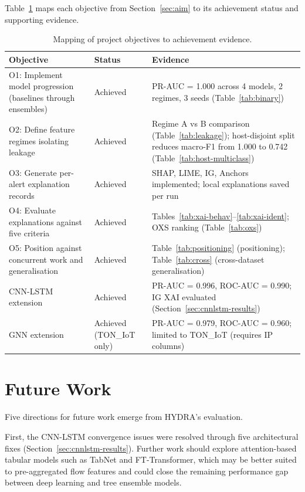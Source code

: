 \documentclass[12pt,a4paper]{report}
\begin{document}
Table~\ref{tab:obj-achievement} maps each objective from Section~\ref{sec:aim} to its achievement status and supporting evidence.

\begin{table}[H]
\centering
\caption{Mapping of project objectives to achievement evidence.}
\label{tab:obj-achievement}
\small
\begin{tabular}{p{}lp{}}
\toprule
\textbf{Objective} & \textbf{Status} & \textbf{Evidence} \\
\midrule
O1: Implement model progression (baselines through ensembles) & Achieved & PR-AUC = 1.000 across 4 models, 2 regimes, 3 seeds (Table~\ref{tab:binary}) \\
\addlinespace
O2: Define feature regimes isolating leakage & Achieved & Regime A vs B comparison (Table~\ref{tab:leakage}); host-disjoint split reduces macro-F1 from 1.000 to 0.742 (Table~\ref{tab:host-multiclass}) \\
\addlinespace
O3: Generate per-alert explanation records & Achieved & SHAP, LIME, IG, Anchors implemented; local explanations saved per run \\
\addlinespace
O4: Evaluate explanations against five criteria & Achieved & Tables~\ref{tab:xai-behav}--\ref{tab:xai-ident}; OXS ranking (Table~\ref{tab:oxs}) \\
\addlinespace
O5: Position against concurrent work and generalisation & Achieved & Table~\ref{tab:positioning} (positioning); Table~\ref{tab:cross} (cross-dataset generalisation) \\
\addlinespace
CNN-LSTM extension & Achieved & PR-AUC = 0.996, ROC-AUC = 0.990; IG XAI evaluated (Section~\ref{sec:cnnlstm-results}) \\
\addlinespace
GNN extension & Achieved (TON\_IoT only) & PR-AUC = 0.979, ROC-AUC = 0.960; limited to TON\_IoT (requires IP columns) \\
\bottomrule
\end{tabular}
\end{table}

\section{Future Work}
\label{sec:future}

Five directions for future work emerge from HYDRA's evaluation.

First, the CNN-LSTM convergence issues were resolved through five architectural fixes (Section~\ref{sec:cnnlstm-results}). Further work should explore attention-based tabular models such as TabNet and FT-Transformer, which may be better suited to pre-aggregated flow features and could close the remaining performance gap between deep learning and tree ensemble models.
\end{document}
